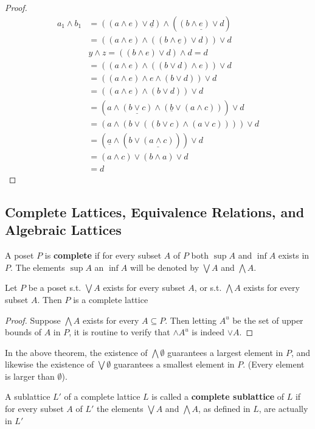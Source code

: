 \documentclass[11pt]{article}
\begin{document}
\begin{proof}
\begin{align*}
a_1\wedge b_1&=((a\wedge e)\vee\underline{d})\wedge(\underline{(b\wedge e)\vee d})\\
&=((a\wedge e)\wedge((b\wedge\underline{e})\vee d))\vee d\tag*{(by M)}\\
&y\wedge z=((b\wedge e)\vee d)\wedge d=d\\
&=((a\wedge e)\wedge((b\vee d)\wedge e))\vee d\tag*{(by M)}\\
&=((a\wedge e)\wedge e\wedge(b\vee d))\vee d\\
&=((a\wedge e)\wedge(b\vee d))\vee d\\
&=(a\wedge\underline{(b\vee c)}\wedge(\underline{b}\vee(a\wedge c)))\vee d\\
&=(a\wedge(b\vee((b\vee c)\wedge(a\vee c))))\vee d\tag*{(by M)}\\
&=(\underline{a}\wedge(b\vee\underline{(a\wedge c)}))\vee d
\tag*{$a\wedge c\le b\vee c$}\\
&=(a\wedge c)\vee(b\wedge a)\vee d\tag*{(by M)}\\
&=d
\end{align*}
\end{proof}


\subsection{Complete Lattices, Equivalence Relations, and Algebraic Lattices}
\label{sec:orge617864}
\begin{definition}[]
A poset \(P\) is \textbf{complete} if for every subset \(A\) of \(P\) both \(\sup A\) and
\(\inf A\) exists in \(P\). The elements \(\sup A\) an \(\inf A\) will be
denoted by \(\bigvee A\) and \(\bigwedge A\).
\end{definition}

\begin{theorem}[]
Let \(P\) be a poset s.t. \(\bigvee A\) exists for every subset \(A\), or s.t. 
\(\bigwedge A\) exists for every subset \(A\). Then \(P\) is a complete lattice
\end{theorem}

\begin{proof}
Suppose \(\bigwedge A\) exists for every \(A\subseteq P\). Then letting \(A^u\)
be the set of upper bounds of \(A\) in \(P\), it is routine to verify that
\(\wedge A^u\) is indeed \(\vee A\).
\end{proof}

In the above theorem, the existence of \(\bigwedge\emptyset\) guarantees a
largest element in \(P\), and likewise the existence of \(\bigvee\emptyset\)
guarantees a smallest element in \(P\). (Every element is larger than
\(\emptyset\)).

\begin{definition}[]
A sublattice \(L'\) of a complete lattice \(L\) is called a \textbf{complete sublattice}
of \(L\) if for every subset \(A\) of \(L'\) the elements \(\bigvee A\) and
\(\bigwedge A\), as defined in \(L\), are actually in \(L'\)
\end{definition}
\end{document}

